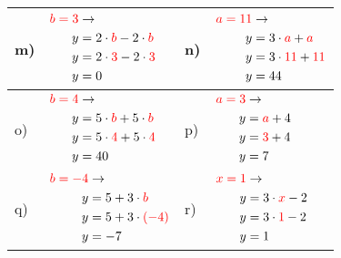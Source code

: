\documentclass[12pt]{article}
\begin{document}
\begin{xltabular}{\textwidth}{|C{0.75cm}|X|C{0.75cm}|X|}
\\\hline
m)&$\begin{aligned}
\textcolor{red}{b=3} & \rightarrow\\
y&=2 \cdot \textcolor{red}{b} - 2 \cdot \textcolor{red}{b}\\
y&=2 \cdot \textcolor{red}{3} - 2 \cdot \textcolor{red}{3}\\
y&=0\\
\end{aligned}$
&
n)&$\begin{aligned}
\textcolor{red}{a=11} & \rightarrow\\
y&=3 \cdot \textcolor{red}{a} + \textcolor{red}{a}\\
y&=3 \cdot \textcolor{red}{11} + \textcolor{red}{11}\\
y&=44\\
\end{aligned}$
\\\hline
o)&$\begin{aligned}
\textcolor{red}{b=4} & \rightarrow\\
y&=5 \cdot \textcolor{red}{b} + 5 \cdot \textcolor{red}{b}\\
y&=5 \cdot \textcolor{red}{4} + 5 \cdot \textcolor{red}{4}\\
y&=40\\
\end{aligned}$
&
p)&$\begin{aligned}
\textcolor{red}{a=3} & \rightarrow\\
y&=\textcolor{red}{a} + 4\\
y&=\textcolor{red}{3} + 4\\
y&=7\\
\end{aligned}$
\\\hline
q)&$\begin{aligned}
\textcolor{red}{b=-4} & \rightarrow\\
y&=5 + 3 \cdot \textcolor{red}{b}\\
y&=5 + 3 \cdot \textcolor{red}{(-4)}\\
y&=-7\\
\end{aligned}$
&
r)&$\begin{aligned}
\textcolor{red}{x=1} & \rightarrow\\
y&=3 \cdot \textcolor{red}{x} - 2\\
y&=3 \cdot \textcolor{red}{1} - 2\\
y&=1\\
\end{aligned}$
\\\hline
\end{xltabular}
\vspace{0.5cm}
\end{document}
